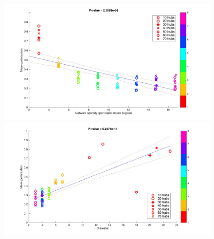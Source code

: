 \documentclass{article}
\begin{document}
\begin{figure}
\hspace{-1.5cm}
\includegraphics[scale=0.20]{img/reg2.jpg}
\hspace{-1.2cm} 
\includegraphics[scale=0.20]{img/reg6.jpg}
\caption{}
\label{reg3}
\end{figure}
\end{document}
